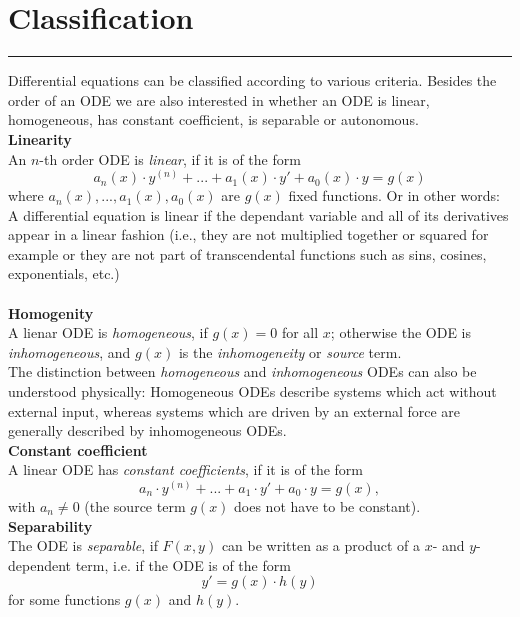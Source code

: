\section{Classification}
\noindent\rule[\linienAbstand]{\linewidth}{\linienDickeDick}

Differential equations can be classified according to various criteria. Besides the order of an ODE we are also interested in whether an ODE is linear, homogeneous, has constant coefficient, is separable or autonomous.\\

\textbf{Linearity}\\
An $n$-th order ODE is \emph{linear}, if it is of the form
\begin{equation}
  a_n(x) \cdot y^{(n)} + ... + a_1(x) \cdot y' + a_0(x) \cdot y = g(x)
\end{equation}
where $a_n(x), ..., a_1(x), a_0(x)$ are $g(x)$ fixed functions. Or in other words: A differential equation is linear if the dependant variable and all of its derivatives appear in a linear fashion (i.e., they are not multiplied together or squared for example or they are not part of transcendental functions such as sins, cosines, exponentials, etc.)\\\\

\textbf{Homogenity}\\
A lienar ODE is \emph{homogeneous}, if $g(x) = 0$ for all $x$; otherwise the ODE is \emph{inhomogeneous}, and $g(x)$ is the \emph{inhomogeneity} or \emph{source} term.\\
The distinction between \emph{homogeneous} and \emph{inhomogeneous} ODEs can also be understood physically: Homogeneous ODEs describe systems which act without external input, whereas systems which are driven by an external force are generally described by inhomogeneous ODEs.\\

\textbf{Constant coefficient}\\
A linear ODE has \emph{constant coefficients}, if it is of the form
\begin{equation}
  a_n \cdot y^{(n)} + ... + a_1 \cdot y'+ a_0 \cdot y = g(x),
\end{equation}
with $a_n \neq 0$ (the source term $g(x)$ does not have to be constant).\\

\textbf{Separability}\\
The ODE is \emph{separable}, if $F(x, y)$ can be written as a product of a $x$- and $y$-dependent term, i.e. if the ODE is of the form
\begin{equation}
  y' = g(x) \cdot h(y)
\end{equation}
for some functions $g(x)$ and $h(y)$.\\

